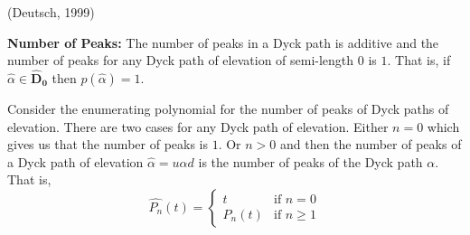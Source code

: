 \documentclass[12pt]{article}
\theoremstyle{definition}
\numberwithin{equation}{section}
\begin{document}


(Deutsch, 1999)

\textbf{Number of Peaks:}
The number of peaks in a Dyck path is additive and the number of peaks for any Dyck path of elevation of semi-length $0$ is $1$. That is, if $\hat{\alpha}\in \mathbf{\hat{D}_0}$ then $p(\hat{\alpha}) = 1$.




Consider the enumerating polynomial for the number of peaks of Dyck paths of elevation. There are two cases for any Dyck path of elevation. Either $n=0$ which gives us that the number of peaks is $1$. Or $n>0$ and then the number of peaks of a Dyck path of elevation $\hat{\alpha} = u\alpha d$ is the number of peaks of the Dyck path $\alpha$. That is,
\begin{equation}
    \hat{P_n}(t) = \begin{cases}
    t & \text{if }n = 0 \\
    P_n(t) & \text{if }n\geq 1
    \end{cases}
\end{equation}
\end{document}
